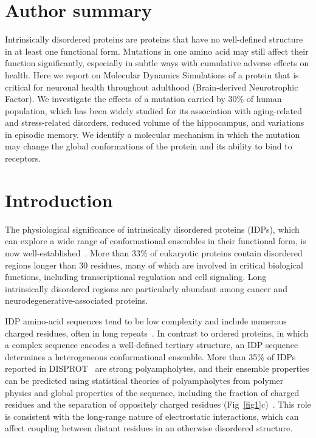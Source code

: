 \documentclass[10pt,letterpaper]{article}
\begin{document}
\section*{Author summary}
Intrinsically disordered proteins are proteins that have no well-defined structure in at least one functional form. Mutations in one amino acid may still affect their function significantly, especially in subtle ways with cumulative adverse effects on health. Here we report on Molecular Dynamics Simulations of a protein that is critical for neuronal health throughout adulthood (Brain-derived Neurotrophic Factor). We investigate the effects of a mutation carried by 30\% of human population, which has been widely studied for its association with aging-related and stress-related disorders, reduced volume of the hippocampus, and variations in episodic memory. We identify a molecular mechanism in which the mutation may change the global conformations of the protein and its ability to bind to receptors.


\section*{Introduction}

The physiological significance of intrinsically disordered proteins (IDPs), which can explore a wide range of conformational ensembles in their functional form, is now well-established~\cite {Uversky2013a,Panchenko2015,Ward2004a,Dyson2005a}. More than 33\% of eukaryotic proteins contain disordered regions longer than 30 residues\cite{Ward2004a}, many of which are involved in critical biological functions, including transcriptional regulation and cell signaling\cite{Dunker2005}. Long intrinsically disordered regions are particularly abundant among cancer and neurodegenerative-associated proteins\cite{Habchi2014,Babu2011}.  

IDP amino-acid sequences tend to be low complexity and include numerous charged residues, often in long repeats~\cite{Uversky2013a}. In contrast to ordered proteins, in which a complex sequence encodes a well-defined tertiary structure, an IDP sequence determines a heterogeneous conformational ensemble. More than 35\% of IDPs reported in DISPROT~\cite{Sickmeier2007a} are strong polyampholytes, and their ensemble properties can be predicted using statistical theories of polyampholytes from polymer physics and global properties of the sequence, including the fraction of charged residues and the separation of oppositely charged residues (Fig~\ref{fig1}c)~\cite{Das2015,Das2013a}. This role is consistent with the long-range nature of electrostatic interactions, which can affect coupling between distant residues in an otherwise disordered structure.  
\end{document}
